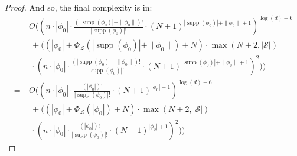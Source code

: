 \documentclass[10pt,a4paper]{article}
\theoremstyle{definition}
\theoremstyle{remark}
\DeclareMathOperator{\supp}{supp}
\newcommand\Lcal{\mathcal{L}}
\newcommand\Scal{\mathcal{S}}
\renewcommand\S{N}
\begin{document}
\begin{proof}
And so, the final complexity is in:
\begin{align*}
	&O((n \cdot|\phi_0|\cdot \frac{(|\supp(\phi_0)| + \|\phi_0\|)!}{|\supp(\phi_0)|!}\cdot (\S + 1)^{|\supp(\phi_0)| + \|\phi_0\| + 1})^{\log(d) + 6}
	\\ &\ + (
	(|\phi_0| + \Phi_\Lcal(|\supp(\phi_0)| + \|\phi_0\|) + \S)
	\cdot
	\max(N + 2, |\Scal|
	) \\&\ \cdot 
	(n \cdot|\phi_0|\cdot \frac{(|\supp(\phi_0)|+\|\phi_0\|)!}{|\supp(\phi_0)|!}\cdot (\S + 1)^{|\supp(\phi_0)| + \|\phi_0\| + 1})
	^2)
	)
	\\
	=\ &O((n \cdot|\phi_0|\cdot \frac{(|\phi_0|)!}{|\supp(\phi_0)|!}\cdot (\S + 1)^{|\phi_0| + 1})^{\log(d) + 6}
	\\ &\ + (
	(|\phi_0| + \Phi_\Lcal(|\phi_0|) + \S)
	\cdot
	\max(N + 2, |\Scal|
	) \\&\ \cdot 
	(n \cdot|\phi_0|\cdot \frac{(|\phi_0|)!}{|\supp(\phi_0)|!}\cdot (\S + 1)^{|\phi_0| + 1})
	^2)
	)
\end{align*}
\end{proof}

 
\end{document}
